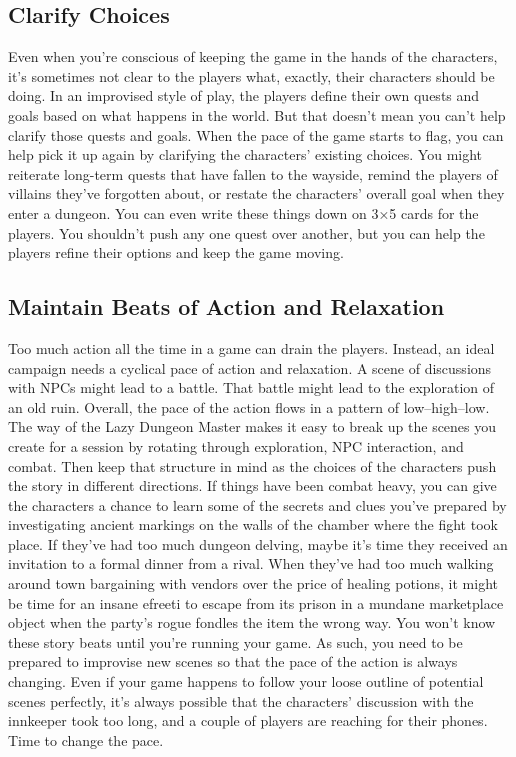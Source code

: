 \documentclass[10pt,a4paper,twoside,bg=print,twocolumn,openany,nodeprecatedcode]{dndbook}
\begin{document}
\subsection{Clarify Choices}
Even when you're conscious of keeping the game in the hands of the characters, it's sometimes not clear to the players what, exactly, their characters should be doing. In an improvised style of play, the players define their own quests and goals based on what happens in the world. But that doesn't mean you can't help clarify those quests and goals.
When the pace of the game starts to flag, you can help pick it up again by clarifying the characters' existing choices. You might reiterate long-term quests that have fallen to the wayside, remind the players of villains they've forgotten about, or restate the characters' overall goal when they enter a dungeon. You can even write these things down on 3×5 cards for the players. You shouldn't push any one quest over another, but you can help the players refine their options and keep the game moving.
\subsection{Maintain Beats of Action and Relaxation}
Too much action all the time in a game can drain the players. Instead, an ideal campaign needs a cyclical pace of action and relaxation. A scene of discussions with NPCs might lead to a battle. That battle might lead to the exploration of an old ruin. Overall, the pace of the action flows in a pattern of low–high–low.
The way of the Lazy Dungeon Master makes it easy to break up the scenes you create for a session by rotating through exploration, NPC interaction, and combat. Then keep that structure in mind as the choices of the characters push the story in different directions.
If things have been combat heavy, you can give the characters a chance to learn some of the secrets and clues you've prepared by investigating ancient markings on the walls of the chamber where the fight took place. If they've had too much dungeon delving, maybe it's time they received an invitation to a formal dinner from a rival. When they've had too much walking around town bargaining with vendors over the price of healing potions, it might be time for an insane efreeti to escape from its prison in a mundane marketplace object when the party's rogue fondles the item the wrong way.
You won't know these story beats until you're running your game. As such, you need to be prepared to improvise new scenes so that the pace of the action is always changing. Even if your game happens to follow your loose outline of potential scenes perfectly, it's always possible that the characters' discussion with the innkeeper took too long, and a couple of players are reaching for their phones. Time to change the pace.
\end{document}
